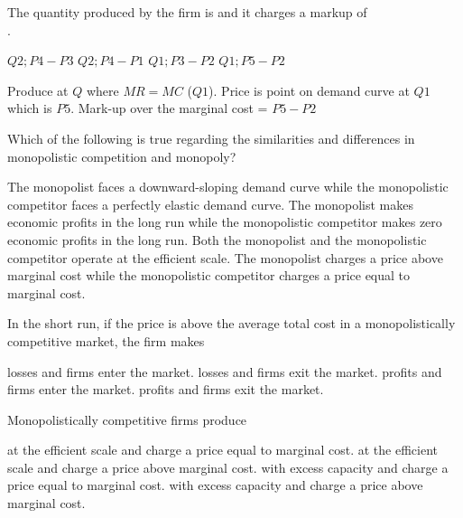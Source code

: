 \documentclass[addpoints,11pt]{exam}
\theoremstyle{definition}
\begin{document}
\begin{questions}
	The quantity produced by the firm is \underline{\hspace{3cm}} and it charges a markup of \\ \underline{\hspace{3cm}}.
	
	\begin{choices}
		\choice $Q2; P4-P3$
		\choice $Q2; P4-P1$
		\choice $Q1; P3-P2$
		\CorrectChoice $Q1; P5-P2$
	\end{choices}
	
	\begin{solution}
		Produce at $Q$ where $MR = MC$ ($Q1$). Price is point on demand curve at $Q1$ which is $P5$. Mark-up over the marginal cost = $P5 - P2$
	\end{solution}
	
\question Which of the following is true regarding the similarities and differences in monopolistic competition and monopoly?

\begin{choices}
	\choice The monopolist faces a downward-sloping demand curve while the monopolistic competitor faces a perfectly elastic demand curve.
	\CorrectChoice The monopolist makes economic profits in the long run while the monopolistic competitor makes zero economic profits in the long run.
	\choice Both the monopolist and the monopolistic competitor operate at the efficient scale.
	\choice The monopolist charges a price above marginal cost while the monopolistic competitor charges a price equal to marginal cost.
\end{choices}

\newpage

\question In the short run, if the price is above the average total cost in a monopolistically competitive market, the firm makes 

\begin{choices}
	\choice losses and firms enter the market.
	\choice losses and firms exit the market.
	\CorrectChoice profits and firms enter the market.
	\choice profits and firms exit the market.
\end{choices}

\question Monopolistically competitive firms produce 

\begin{choices}
	\choice at the efficient scale and charge a price equal to marginal cost.
	\choice at the efficient scale and charge a price above marginal cost.
	\choice with excess capacity and charge a price equal to marginal cost.
	\CorrectChoice with excess capacity and charge a price above marginal cost.
\end{choices}


\end{questions}
\end{document}
